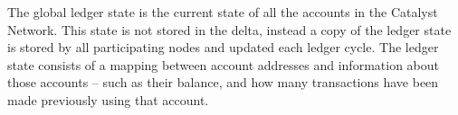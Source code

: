 The global ledger state is the current state of all the accounts in the Catalyst Network. This state is not stored in the delta, instead a copy of the ledger state is stored by all participating nodes and updated each ledger cycle. The ledger state consists of a mapping between account addresses and information about those accounts – such as their balance, and how many transactions have been made previously using that account.